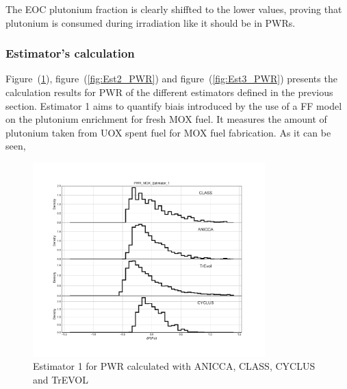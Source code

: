 The EOC plutonium fraction is clearly shiffted to the lower values, proving that plutonium is consumed during irradiation like it should be in PWRs.   

\subsubsection{Estimator's calculation}

Figure~(\ref{fig:Est1_PWR}), figure~(\ref{fig:Est2_PWR}) and figure~(\ref{fig:Est3_PWR}) presents the calculation results for PWR of the different estimators defined in the previous section. Estimator 1 aims to quantify biais introduced by the use of a FF model on the plutonium enrichment for fresh MOX fuel. It measures the amount of plutonium taken from UOX spent fuel for MOX fuel fabrication. As it can be seen, 

\begin{figure}[h]
	\begin{center}
		\includegraphics[width = 0.8\textwidth]{../../Feature_1/RAW_DATA/FIG/PWR_MOX_Estimator_1.pdf}
		\caption{Estimator 1 for PWR calculated with ANICCA, CLASS, CYCLUS and TrEVOL}
		\label{fig:Est1_PWR}
	\end{center}
\end{figure}


